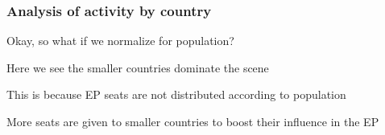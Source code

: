 \documentclass{beamer}
\begin{document}
\begin{frame}
	\frametitle{Analysis of activity by country}
	Okay, so what if we normalize for population?
	
	\vspace{0.3cm}
	

	\vspace{0.3cm}
	
	\pause Here we see the smaller countries dominate the scene
	
	\pause This is because EP seats are not distributed according to population
	
	\pause More seats are given to smaller countries to boost their influence in the EP
	
\end{frame}
\end{document}
